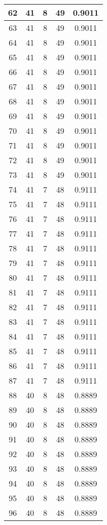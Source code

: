 \documentclass[letterpaper, 12pt]{article}
\begin{document}
\begin{longtable}{|c|c|c|c|c|}
\hline
62 & 41 & 8 & 49 & 0.9011 \\
\hline
63 & 41 & 8 & 49 & 0.9011 \\
\hline
64 & 41 & 8 & 49 & 0.9011 \\
\hline
65 & 41 & 8 & 49 & 0.9011 \\
\hline
66 & 41 & 8 & 49 & 0.9011 \\
\hline
67 & 41 & 8 & 49 & 0.9011 \\
\hline
68 & 41 & 8 & 49 & 0.9011 \\
\hline
69 & 41 & 8 & 49 & 0.9011 \\
\hline
70 & 41 & 8 & 49 & 0.9011 \\
\hline
71 & 41 & 8 & 49 & 0.9011 \\
\hline
72 & 41 & 8 & 49 & 0.9011 \\
\hline
73 & 41 & 8 & 49 & 0.9011 \\
\hline
74 & 41 & 7 & 48 & 0.9111 \\
\hline
75 & 41 & 7 & 48 & 0.9111 \\
\hline
76 & 41 & 7 & 48 & 0.9111 \\
\hline
77 & 41 & 7 & 48 & 0.9111 \\
\hline
78 & 41 & 7 & 48 & 0.9111 \\
\hline
79 & 41 & 7 & 48 & 0.9111 \\
\hline
80 & 41 & 7 & 48 & 0.9111 \\
\hline
81 & 41 & 7 & 48 & 0.9111 \\
\hline
82 & 41 & 7 & 48 & 0.9111 \\
\hline
83 & 41 & 7 & 48 & 0.9111 \\
\hline
84 & 41 & 7 & 48 & 0.9111 \\
\hline
85 & 41 & 7 & 48 & 0.9111 \\
\hline
86 & 41 & 7 & 48 & 0.9111 \\
\hline
87 & 41 & 7 & 48 & 0.9111 \\
\hline
88 & 40 & 8 & 48 & 0.8889 \\
\hline
89 & 40 & 8 & 48 & 0.8889 \\
\hline
90 & 40 & 8 & 48 & 0.8889 \\
\hline
91 & 40 & 8 & 48 & 0.8889 \\
\hline
92 & 40 & 8 & 48 & 0.8889 \\
\hline
93 & 40 & 8 & 48 & 0.8889 \\
\hline
94 & 40 & 8 & 48 & 0.8889 \\
\hline
95 & 40 & 8 & 48 & 0.8889 \\
\hline
96 & 40 & 8 & 48 & 0.8889 \\

\end{longtable}
\end{document}
